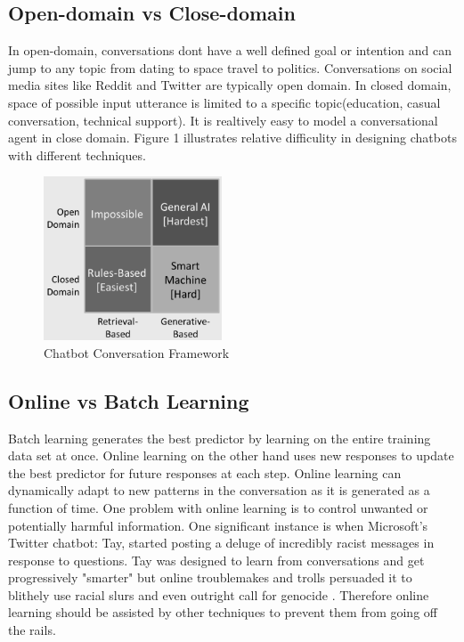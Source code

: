 \documentclass[letterpaper] {article} %
\begin{document}
\subsection{Open-domain vs Close-domain}
In open-domain, conversations dont have a well defined goal or intention and can jump to any topic from dating to space travel to politics. Conversations on social media sites like Reddit and Twitter are typically open domain. In closed domain, space of possible input utterance is limited to a specific topic(education, casual conversation, technical support). It is realtively easy to model a conversational agent in close domain. Figure 1 illustrates relative difficulity in designing chatbots with different techniques.
\begin{figure}[ht]
	\centering
	\includegraphics[width=200px]{figures/chatbots.png}
	\caption{Chatbot Conversation Framework\cite{chatbot:framework}}
	\label{fig:chatbotframework}
\end{figure}
\subsection{Online vs Batch Learning}
Batch learning generates the best predictor by learning on the entire training data set at once. Online learning on the other hand uses new responses to update the best predictor for future responses at each step. Online learning can dynamically adapt to new patterns in the conversation as it is generated as a function of time. One problem with online learning is to control unwanted or potentially harmful information. One significant instance is when Microsoft's Twitter chatbot: Tay, started posting a deluge of incredibly racist messages in response to questions. Tay was designed to learn from conversations and get progressively "smarter" but online troublemakes and trolls persuaded it to blithely use racial slurs and even outright call for genocide \cite{microsoft:tay}. Therefore online learning should be assisted by other techniques to prevent them from going off the rails.
\end{document}
